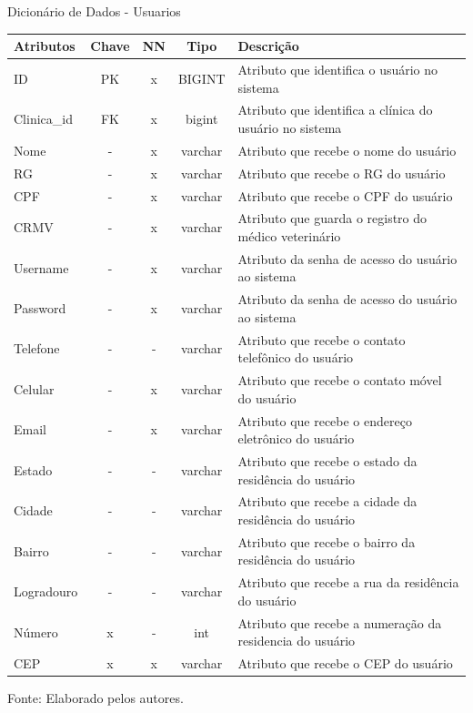 \documentclass[
    12pt,               %
    openright,          %
    oneside,
    a4paper,            %
    BIBLATEX,           %
    TODO,               %
    english,            %
    brazil              %
    ]{ifsp-spo-inf-ctds}
\begin{document}
    \begin{center}
      \begin{quadro}[H]
      \centering
          \caption{Dicionário de Dados - Usuarios}
          \begin{tabulary}{1.0\textwidth}{|p{9em}|c|c|c|p{19em}|}
        \hline
        Atributos & Chave & NN & Tipo & Descrição\\
        \hline
        ID & PK & x & BIGINT & Atributo que identifica o usuário no sistema \\
        \hline
        Clinica\_id & FK & x & bigint & Atributo que identifica a clínica do usuário no sistema \\
        \hline
        Nome & - & x & varchar & Atributo que recebe o nome do usuário \\
        \hline
        RG & - & x & varchar & Atributo que recebe o RG do usuário\\
        \hline
        CPF & - & x & varchar & Atributo que recebe o CPF do usuário\\
        \hline
        CRMV & - & x & varchar & Atributo que guarda o registro do médico veterinário\\
        \hline
        Username & - & x & varchar & Atributo da senha de acesso do usuário ao sistema\\
        \hline
        Password & - & x & varchar & Atributo da senha de acesso do usuário ao sistema\\
        \hline
        Telefone & - & - & varchar & Atributo que recebe o contato telefônico do usuário\\
        \hline
        Celular & - & x & varchar & Atributo que recebe o contato móvel do usuário \\
        \hline
        Email & - & x & varchar & Atributo que recebe o endereço eletrônico do usuário\\
        \hline
        Estado & - & - & varchar & Atributo que recebe o estado da residência do usuário\\
        \hline
        Cidade & - & - & varchar & Atributo que recebe a cidade da residência do usuário\\
        \hline
        Bairro & - & - & varchar & Atributo que recebe o bairro da residência do usuário\\
        \hline
        Logradouro & - & - & varchar & Atributo que recebe a rua da residência do usuário \\
        \hline
        Número & x & - & int & Atributo que recebe a numeração da residencia do usuário\\
        \hline
        CEP & x & x & varchar & Atributo que recebe o CEP do usuário\\
        \hline
        \end{tabulary}
         
          \label{qd: md-usuario}
          \centering
        {\footnotesize Fonte: Elaborado pelos autores.}
      \end{quadro}
    \end{center}
    
\end{document}
